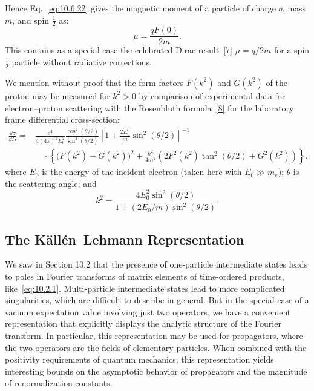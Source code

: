 
Hence Eq.~\eqref{eq:10.6.22} gives the magnetic moment of a particle of charge
$q$, mass $m$, and spin $\frac12$ as:
\begin{equation}
  \mu=\frac{qF(0)}{2m}.
  \tag{10.6.24}\label{eq:10.6.24}
\end{equation}
This contains as a special case the celebrated Dirac result~\hyperref[ref:10.7]{[7]}
$\mu=q/2m$ for a spin $\frac12$ particle without radiative corrections.

We mention without proof that the form factors $F(k^2)$ and $G(k^2)$ of
the proton may be measured for $k^2>0$ by comparison of experimental
data for electron--proton scattering with the Rosenbluth formula~\hyperref[ref:10.8]{[8]}
for the laboratory frame differential cross-section:
\begin{align*}
  \frac{\dd\sigma}{\dd\Omega}
  ={}&\frac{e^4}{4(4\pi)^2E_0^2}
  \frac{\cos^2(\theta/2)}{\sin^4(\theta/2)}
  \left[1+\frac{2E_0}{m}\sin^2(\theta/2)\right]^{-1}\\
  &\quad\cdot\left\{
  \bigl(F(k^2)+G(k^2)\bigr)^2
  +\frac{k^2}{4m^2}\left(2F^2(k^2)\tan^2(\theta/2)+G^2(k^2)\right)
  \right\},
\end{align*}
where $E_0$ is the energy of the incident electron (taken here with
$E_0\gg m_e$); $\theta$ is the scattering angle; and
\begin{equation*}
  k^2=\frac{4E_0^2\sin^2(\theta/2)}
  {1+(2E_0/m)\sin^2(\theta/2)}.
\end{equation*}

\subsection[The K\"all\'en--Lehmann Representation]{The K\"all\'en--Lehmann Representation\texorpdfstring{\protect\footnotemark}{}}

We saw in Section 10.2 that the presence of one-particle intermediate
states leads to poles in Fourier transforms of matrix elements of time-ordered
products, like~\eqref{eq:10.2.1}. Multi-particle intermediate states
lead to more complicated singularities, which are difficult to describe in
general. But in the special case of a vacuum expectation value involving just
two operators, we have a convenient representation that explicitly displays
the analytic structure of the Fourier transform. In particular, this
representation may be used for propagators, where the two operators are the
fields of elementary particles. When combined with the positivity requirements
of quantum mechanics, this representation yields interesting bounds on the
asymptotic behavior of propagators and the magnitude of renormalization
constants.


